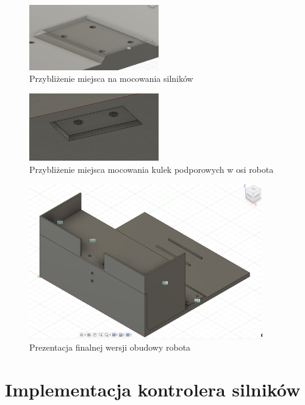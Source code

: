 \begin{figure}[H]
  \centering
  \includegraphics[width=0.5\textwidth]{./graf/motor-close.png}
  \caption{Przybliżenie miejsca na mocowania silników}
  \label{fig:base-close}
\end{figure}

\begin{figure}[H]
  \centering
  \includegraphics[width=0.5\textwidth]{./graf/ball-close.png}
  \caption{Przybliżenie miejsca mocowania kulek podporowych w osi robota}
  \label{fig:ball-close}
\end{figure}

\begin{figure}[H]
  \centering
  \includegraphics[width=0.9\textwidth]{./graf/full.png}
  \caption{Prezentacja finalnej wersji obudowy robota}
  \label{fig:full}
\end{figure}
 
\clearpage

\section{Implementacja kontrolera silników}

